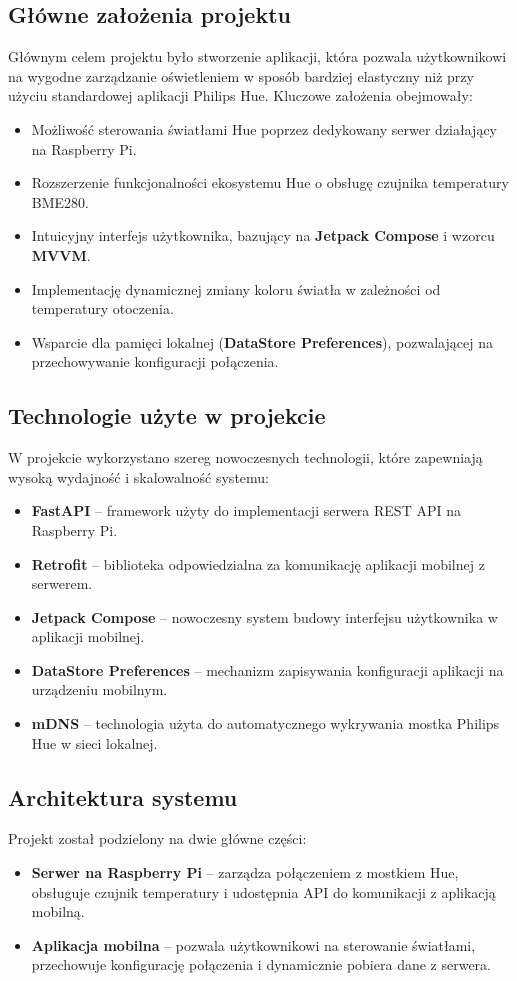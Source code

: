 \documentclass[12pt]{article}
\begin{document}
\subsection{Główne założenia projektu}
\noindent Głównym celem projektu było stworzenie aplikacji, która pozwala użytkownikowi na wygodne zarządzanie oświetleniem w sposób bardziej elastyczny niż przy użyciu standardowej aplikacji Philips Hue.
Kluczowe założenia obejmowały:
\begin{itemize}
    \item Możliwość sterowania światłami Hue poprzez dedykowany serwer działający na Raspberry Pi.
    \item Rozszerzenie funkcjonalności ekosystemu Hue o obsługę czujnika temperatury BME280.
    \item Intuicyjny interfejs użytkownika, bazujący na \textbf{Jetpack Compose} i wzorcu \textbf{MVVM}.
    \item Implementację dynamicznej zmiany koloru światła w zależności od temperatury otoczenia.
    \item Wsparcie dla pamięci lokalnej (\textbf{DataStore Preferences}), pozwalającej na przechowywanie konfiguracji połączenia.
\end{itemize}

\subsection{Technologie użyte w projekcie}
\noindent W projekcie wykorzystano szereg nowoczesnych technologii, które zapewniają wysoką wydajność i skalowalność systemu:
\begin{itemize}
    \item \textbf{FastAPI} – framework użyty do implementacji serwera REST API na Raspberry Pi.
    \item \textbf{Retrofit} – biblioteka odpowiedzialna za komunikację aplikacji mobilnej z serwerem.
    \item \textbf{Jetpack Compose} – nowoczesny system budowy interfejsu użytkownika w aplikacji mobilnej.
    \item \textbf{DataStore Preferences} – mechanizm zapisywania konfiguracji aplikacji na urządzeniu mobilnym.
    \item \textbf{mDNS} – technologia użyta do automatycznego wykrywania mostka Philips Hue w sieci lokalnej.
\end{itemize}

\subsection{Architektura systemu}
\noindent Projekt został podzielony na dwie główne części:
\begin{itemize}
    \item \textbf{Serwer na Raspberry Pi} – zarządza połączeniem z mostkiem Hue, obsługuje czujnik temperatury i udostępnia API do komunikacji z aplikacją mobilną.
    \item \textbf{Aplikacja mobilna} – pozwala użytkownikowi na sterowanie światłami, przechowuje konfigurację połączenia i dynamicznie pobiera dane z serwera.
\end{itemize}
\end{document}
